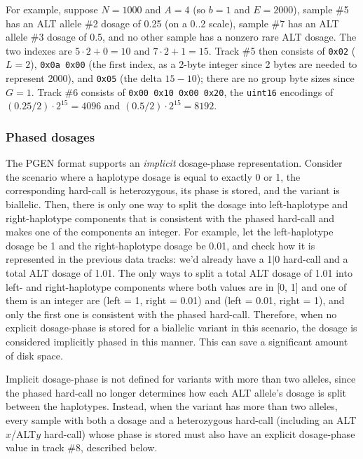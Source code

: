 \documentclass[8pt]{article}
\begin{document}
For example, suppose $N=1000$ and $A=4$ (so $b=1$ and $E=2000$), sample \#5 has
an ALT allele \#2 dosage of 0.25 (on a 0..2 scale), sample \#7 has an ALT
allele \#3 dosage of 0.5, and no other sample has a nonzero rare ALT dosage.
The two indexes are $5\cdot 2 + 0 = 10$ and $7\cdot 2 + 1 = 15$.  Track \#5
then consists of \texttt{0x02} ($L=2$), \texttt{0x0a 0x00} (the first index,
as a 2-byte integer since 2 bytes are needed to represent 2000), and
\texttt{0x05} (the delta $15-10$); there are no group byte sizes since $G=1$.
Track \#6 consists of \texttt{0x00 0x10 0x00 0x20}, the \texttt{uint16}
encodings of $(0.25/2)\cdot 2^{15}=4096$ and $(0.5/2)\cdot 2^{15}=8192$.

\subsubsection{Phased dosages}

The PGEN format supports an \textit{implicit} dosage-phase representation.
Consider the scenario where a haplotype dosage is equal to exactly 0 or 1, the
corresponding hard-call is heterozygous, its phase is stored, and the variant
is biallelic.  Then, there is only one way to split the dosage into
left-haplotype and right-haplotype components that is consistent with the
phased hard-call and makes one of the components an integer.  For example, let
the left-haplotype dosage be 1 and the right-haplotype dosage be 0.01, and
check how it is represented in the previous data tracks: we'd already have a
1$|$0 hard-call and a total ALT dosage of 1.01.  The only ways to split a total
ALT dosage of 1.01 into left- and right-haplotype components where both values
are in [0, 1] and one of them is an integer are (left = 1, right = 0.01) and
(left = 0.01, right = 1), and only the first one is consistent with the phased
hard-call.  Therefore, when no explicit dosage-phase is stored for a biallelic
variant in this scenario, the dosage is considered implicitly phased in this
manner.  This can save a significant amount of disk space.

Implicit dosage-phase is not defined for variants with more than two alleles,
since the phased hard-call no longer determines how each ALT allele's dosage
is split between the haplotypes.  Instead, when the variant has more than two
alleles, every sample with both a dosage and a heterozygous hard-call (including
an ALT$x$/ALT$y$ hard-call) whose phase is stored must also have an explicit
dosage-phase value in track \#8, described below.
\end{document}
